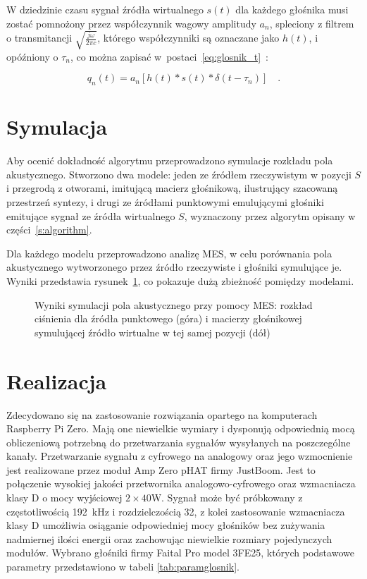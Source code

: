 \documentclass[12pt]{oska}
\let\Oldsection\section
\renewcommand{\section}{\FloatBarrier\Oldsection}
\begin{document}
W dziedzinie czasu sygnał źródła wirtualnego $s(t)$ dla każdego głośnika musi zostać pomnożony
przez współczynnik wagowy amplitudy $a_n$, spleciony z filtrem o transmitancji 
$\sqrt{\frac{j\omega}{2\pi c}}$, którego współczynniki są oznaczane jako $h(t)$, i
opóźniony o $\tau_n$, co można zapisać w~postaci~\eqref{eq:glosnik_t}~\cite{enhancement}:

\begin{equation}
  q_n(t) = a_n\left[h(t)*s(t)*\delta(t-\tau_n)\right] \quad. \label{eq:glosnik_t}
\end{equation}

\section{Symulacja}

Aby ocenić dokładność algorytmu przeprowadzono symulacje rozkładu pola akustycznego.
Stworzono dwa modele: jeden ze
źródłem rzeczywistym w pozycji $S$ i przegrodą z otworami, imitującą macierz
głośnikową, ilustrujący szacowaną przestrzeń syntezy, i drugi ze źródłami
punktowymi emulującymi głośniki emitujące sygnał ze źródła wirtualnego $S$,
wyznaczony przez algorytm opisany w części~\ref{s:algorithm}.

Dla każdego modelu przeprowadzono analizę MES, w celu porównania pola akustycznego
wytworzonego przez źródło rzeczywiste i głośniki
symulujące je. Wyniki przedstawia rysunek~\ref{r:fem}, co pokazuje dużą zbieżność
pomiędzy modelami.

\begin{figure}[!tbh]
  \centering
  \caption{Wyniki symulacji pola akustycznego przy pomocy MES:
    rozkład ciśnienia dla źródła punktowego (góra) i macierzy głośnikowej
  symulującej źródło wirtualne w tej samej pozycji (dół)}
  \label{r:fem}
\end{figure}


\section{Realizacja}

Zdecydowano się na zastosowanie rozwiązania opartego na komputerach Raspberry
Pi Zero. Mają one niewielkie wymiary i dysponują odpowiednią mocą obliczeniową potrzebną
do przetwarzania sygnałów wysyłanych na poszczególne kanały. Przetwarzanie
sygnału z cyfrowego na analogowy oraz jego wzmocnienie jest realizowane
przez moduł Amp Zero pHAT firmy JustBoom. Jest to połączenie wysokiej jakości
przetwornika analogowo-cyfrowego oraz wzmacniacza klasy D o mocy wyjściowej
$2\times40\si{\watt}$. Sygnał może być próbkowany z częstotliwością
\SI{192}{\kilo\hertz} i rozdzielczością \SI{32}{\bit}, z kolei zastosowanie
wzmacniacza klasy D umożliwia osiąganie odpowiedniej mocy głośników bez
zużywania nadmiernej ilości energii oraz zachowując niewielkie rozmiary
pojedynczych modułów. 
Wybrano głośniki firmy Faital Pro model 3FE25, których podstawowe parametry
przedstawiono w tabeli \ref{tab:paramglosnik}.
\end{document}
